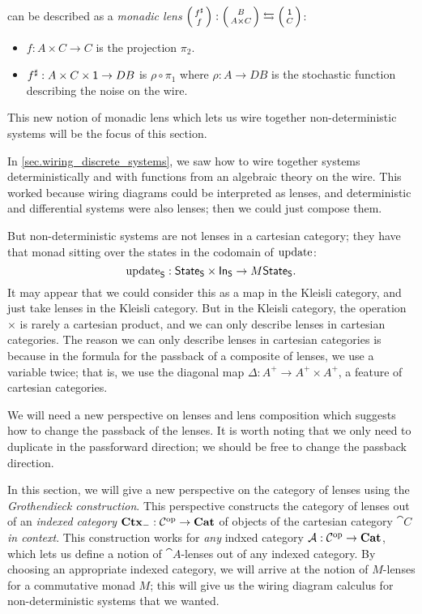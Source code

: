 \documentclass[DynamicalBook]{subfiles}
\begin{document}
can be described as a \emph{monadic lens} $\lens{f^{\sharp}}{f} : \lens{B}{A
  \times C} \fromto \lens{\ord{1}}{C}$:
\begin{itemize}
\item $f : A \times C \to C$ is the projection $\pi_2$.
\item $f^{\sharp}: A \times C \times \mathsf{1} \to D B$ is $\rho \circ \pi_1$ where $\rho : A \to
  D B$ is the stochastic function describing the noise on the wire.
\end{itemize}
This new notion of monadic lens which lets us wire together non-deterministic
systems will be the focus of this section.

In \cref{sec.wiring_discrete_systems}, we saw how to wire together systems
deterministically and with functions from an algebraic theory on the wire. This
worked because wiring diagrams could be interpreted as lenses, and deterministic
and differential systems were also lenses; then we could just compose them.

But non-deterministic systems are not lenses in a cartesian category; they have
that monad sitting over the states in the codomain of $\mathrm{update}_{\mathsf{}}$:
\[
\mathrm{update}_{\mathsf{S}} : \mathsf{State}_{\mathsf{S}} \times \mathsf{In}_{\mathsf{S}} \to M \mathsf{State}_{\mathsf{S}}.
\]
It may appear that we could consider this as a map in the Kleisli category, and
just take lenses in the Kleisli category. But in the Kleisli category, the
operation $\times$ is rarely a cartesian product, and we can only describe
lenses in cartesian categories. The reason we can only describe lenses in
cartesian categories is because in the formula for the passback of a composite
of lenses, we use a variable twice; that is, we use the diagonal map $\Delta : A^+ \to
A^+ \times A^+$, a feature of cartesian categories. 


We will need a new perspective on lenses and
lens composition which suggests how to change the passback of the lenses. It is
worth noting that we only need to duplicate in the passforward direction; we
should be free to change the passback direction.

In this section, we will give a new perspective on the category of lenses using
the \emph{Grothendieck construction}. This perspective constructs the category
of lenses out of an \emph{indexed category} $\textbf{Ctx}_{-} : \mathcal{C}^{\textnormal{op}} \to
\textbf{Cat}$ of objects of the cartesian category $\cat{C}$ \emph{in context}.
This construction works for \emph{any} indxed category $\mathcal{A} : \mathcal{C}^{\textnormal{op}} \to
\textbf{Cat}$, which lets us define a notion of $\cat{A}$-lenses out of any indexed
category. By choosing an appropriate indexed category, we will arrive at the
notion of $M$-lenses for a commutative monad $M$; this will give us the wiring
diagram calculus for non-deterministic systems that we wanted.
\end{document}
